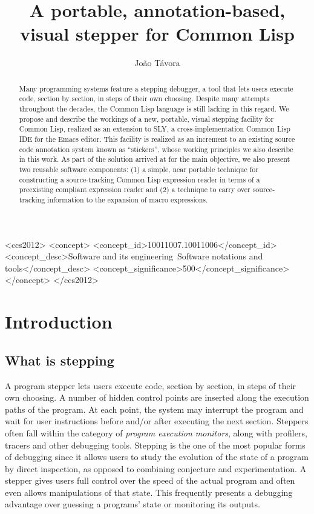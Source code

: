 \documentclass[format=sigconf]{acmart}
\author{João Távora} \affiliation{Ravenpack}
\begin{document}
\title{A portable, annotation-based, visual stepper for Common Lisp}

\begin{abstract}
  Many programming systems feature a stepping debugger, a tool that
  lets users execute code, section by section, in steps of their own
  choosing.  Despite many attempts throughout the decades, the Common
  Lisp language is still lacking in this regard.  We propose and
  describe the workings of a new, portable, visual stepping facility
  for Common Lisp, realized as an extension to SLY, a
  cross-implementation Common Lisp IDE for the Emacs editor.  This
  facility is realized as an increment to an existing source code
  annotation system known as ``stickers'', whose working principles we
  also describe in this work.  As part of the solution arrived at for
  the main objective, we also present two reusable software
  components: (1) a simple, near portable technique for constructing a
  source-tracking Common Lisp expression reader in terms of a
  preexisting compliant expression reader and (2) a technique to carry
  over source-tracking information to the expansion of macro
  expressions.
\end{abstract}


\begin{CCSXML}
<ccs2012>
   <concept>
       <concept_id>10011007.10011006</concept_id>
       <concept_desc>Software and its engineering~Software notations and tools</concept_desc>
       <concept_significance>500</concept_significance>
       </concept>
 </ccs2012>
\end{CCSXML}


\maketitle
\section{Introduction}
\subsection{What is stepping}

A program stepper lets users execute code, section by section, in
steps of their own choosing.  A number of hidden control points are
inserted along the execution paths of the program.  At each point, the
system may interrupt the program and wait for user instructions before
and/or after executing the next section.  Steppers often fall within
the category of \emph{program execution monitors}, along with
profilers, tracers and other debugging tools.  Stepping is the one of
the most popular forms of debugging since it allows users to study the
evolution of the state of a program by direct inspection, as opposed
to combining conjecture and experimentation.  A stepper gives users
full control over the speed of the actual program and often even
allows manipulations of that state.  This frequently presents a
debugging advantage over guessing a programs' state or monitoring its
outputs.
\end{document}
